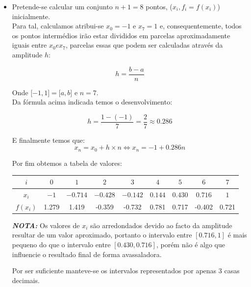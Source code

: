 \documentclass[12pt, letterpaper,fleqn]{article}
\begin{document}
\begin{itemize}
    \item Pretende-se calcular um conjunto $n+1 = 8$ pontos, ($x_i, f_i = f(x_i)$) inicialmente. \\
    
    Para tal, calculamos atribui-se $x_0 = -1$ e $x_7 = 1$ e, consequentemente, todos os pontos intermédios irão estar divididos em parcelas aproximadamente iguais entre $x_0 e x_7$, parcelas essas que podem ser calculadas através da amplitude $h$:
    
    $$h = \frac{b-a}{n}$$
    

    Onde $\mathopen[-1,1\mathclose] = \mathopen[a,b\mathclose]$ e $n = 7$. \\
    
    Da fórmula acima indicada temos o desenvolvimento:

    $$h = \frac{1-(-1)}{7} = \frac{2}{7} \approx 0.286$$

    E finalmente temos que:
    $$x_n = x_0 + h\times n \Leftrightarrow x_n = -1 + 0.286n$$

    Por fim obtemos a tabela de valores:
    
    \begin{center}
        \begin{tabular} {|| c | c | c | c | c | c | c | c | c ||} \hline
            $i$ & $0$ & $1$ & $2$ & $3$ & $4$ & $5$ & $6$ & $7$\\ [0.4ex]\hline
            $x_i$ & $-1$ & $-0.714$ & $-0.428$ & $-0.142$ & $0.144$ & $0.430$ & $0.716$ & $1$ \\ [0.4ex]\hline
            $f(x_i)$ & 1.279 & 1.419 & -0.359 & -0.732 & 0.781 & 0.717 & -0.402 & 0.721 \\ [0.4ex]\hline
        \end{tabular}
    \end{center}

    \textbf{\textit{NOTA:}} Os valores de $x_i$ são arredondados devido ao facto da amplitude resultar de um valor aproximado, portanto o intervalo entre $[0.716,1]$ é mais pequeno do que o intervalo entre $[0.430, 0.716]$, porém não é algo que influencie o resultado final de forma avassaladora.

    Por ser suficiente manteve-se os intervalos representados por apenas 3 casas decimais.


\end{itemize}
\end{document}
